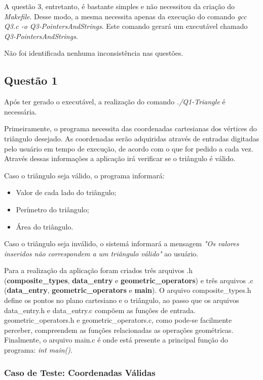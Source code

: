 	A questão 3, entretanto, é bastante simples e não necessitou da criação do \textit{Makefile}. Desse modo, a mesma
	necessita apenas da execução do comando \textit{gcc Q3.c -o Q3-PointersAndStrings}. Este comando gerará um executável
	chamado \textit{Q3-PointersAndStrings}.

	Não foi identificada nenhuma inconsistência nas questões.

\subsection{Questão 1}

	Após ter gerado o executável, a realização do comando \textit{./Q1-Triangle} é necessária.

	Primeiramente, o programa necessita das coordenadas cartesianas dos vértices do triângulo desejado. As coordenadas
	serão adquiridas através de entradas digitadas pelo usuário em tempo de execução, de acordo com o que for pedido a
	cada vez. Através dessas informações a aplicação irá verificar se o triângulo é válido.

	Caso o triângulo seja válido, o programa informará:

	\begin{itemize}

		\item Valor de cada lado do triângulo;
		\item Perímetro do triângulo;
		\item Área do triângulo.

	\end{itemize}

	Caso o triângulo seja inválido, o sistemá informará a mensagem \textit{"Os valores inseridos não correspondem a um
	triângulo válido"} ao usuário.

	Para a realização da aplicação foram criados três arquivos .h (\textbf{composite\_types}, \textbf{data\_entry} e
	\textbf{geometric\_operators}) e três arquivos .c (\textbf{data\_entry}, \textbf{geometric\_operators} e
	\textbf{main}). O arquivo composite\_types.h define os pontos no plano cartesiano e o triângulo, ao passo que os
	arquivos data\_entry.h e data\_entry.c compõem as funções de entrada. geometric\_operators.h e geometric\_operators.c,
	como pode-se facilmente perceber, compreendem as funções relacionadas as operações geométricas. Finalmente, o arquivo
	main.c é onde está presente a principal função do programa: \textit{int main()}.

	\subsubsection{Caso de Teste: Coordenadas Válidas}

